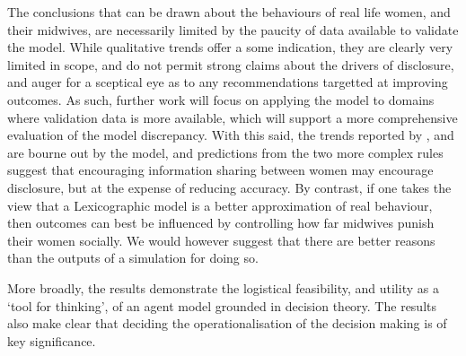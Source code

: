 The conclusions that can be drawn about the behaviours of real life women, and their midwives, are necessarily limited by the paucity of data available to validate the model. While qualitative trends offer a some indication, they are clearly very limited in scope, and do not permit strong claims about the drivers of disclosure, and auger for a sceptical eye as to any recommendations targetted at improving outcomes.  As such, further work will focus on applying the model to domains where validation data is more available, which will support a more comprehensive evaluation of the model discrepancy. 
With this said, the trends reported by \citet{Alvik2006}, and \citet{Phillips2007} are bourne out by the model, and predictions from the two more complex rules suggest that encouraging information sharing between women may encourage disclosure, but at the expense of reducing accuracy. By contrast, if one takes the view that a Lexicographic model is a better approximation of real behaviour, then outcomes can best be influenced by controlling how far midwives punish their women socially. We would however suggest that there are better reasons than the outputs of a simulation for doing so.

More broadly, the results demonstrate the logistical feasibility, and utility as a `tool for thinking', of an agent model grounded in decision theory. The results also make clear that deciding the operationalisation of the decision making is of key significance.

